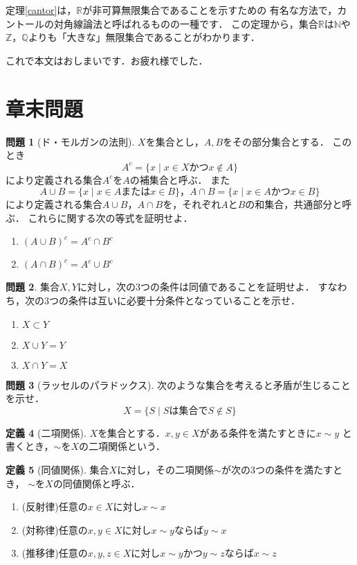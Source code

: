 ﻿\documentclass[./main]{subfiles} %
\theoremstyle{definition}
\newtheorem{hamadadefi}{定義}[section]
\newtheorem{hamadaqst}[hamadadefi]{問題}
\begin{document}
定理\ref{cantor}は，$\mathbb{R}$が非可算無限集合であることを示すための
有名な方法で，カントールの対角線論法と呼ばれるものの一種です．
この定理から，集合$\mathbb{R}$は$\mathbb{N}$や
$\mathbb{Z}$，$\mathbb{Q}$よりも「大きな」無限集合であることがわかります．

これで本文はおしまいです．お疲れ様でした．

\section{章末問題}
\begin{hamadaqst}[ド・モルガンの法則]
\label{demorgan}
$X$を集合とし，$A,B$をその部分集合とする．
このとき
\[ A^c=\{x\mid x\in X かつ x\notin A\} \]
により定義される集合$A^c$を$A$の補集合と呼ぶ．
また
\[ A\cup B=\{x\mid x\in A または x\in B\}，A\cap B=\{x\mid x\in A かつ x\in B\} \]
により定義される集合$A\cup B$，$A\cap B$を，それぞれ$A$と$B$の和集合，共通部分と呼ぶ．
これらに関する次の等式を証明せよ．
\begin{enumerate}
\item $(A\cup B)^c=A^c\cap B^c$
\item $(A\cap B)^c=A^c\cup B^c$
\end{enumerate}
\end{hamadaqst}

\begin{hamadaqst}
\label{subsetequiv}
集合$X,Y$に対し，次の3つの条件は同値であることを証明せよ．
すなわち，次の3つの条件は互いに必要十分条件となっていることを示せ．
\begin{enumerate}
\item $X\subset Y$
\item $X\cup Y=Y$
\item $X\cap Y=X$
\end{enumerate}
\end{hamadaqst}

\begin{hamadaqst}[ラッセルのパラドックス]
\label{russel}
次のような集合を考えると矛盾が生じることを示せ．
\[ X=\{S\mid Sは集合でS\notin S\} \]
\end{hamadaqst}

\begin{hamadadefi}[二項関係]
$X$を集合とする．$x,y\in X$がある条件を満たすときに$x\sim y$
と書くとき，$\sim$を$X$の二項関係という．
\end{hamadadefi}

\begin{hamadadefi}[同値関係]
集合$X$に対し，その二項関係$\sim$が次の3つの条件を満たすとき，
$\sim$を$X$の同値関係と呼ぶ．
\begin{enumerate}
\item(反射律)任意の$x\in X$に対し$x\sim x$
\item(対称律)任意の$x,y\in X$に対し$x\sim y$ならば$y\sim x$
\item(推移律)任意の$x,y,z\in X$に対し$x\sim y$かつ$y\sim z$ならば$x\sim z$
\end{enumerate}
\end{hamadadefi}
\end{document}
